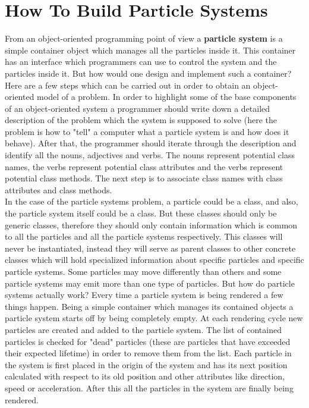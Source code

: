 \section{How To Build Particle Systems}
From an object-oriented programming point of view a \textbf{particle system} is a simple container object which manages all the particles inside it. This container has an interface which programmers can use to control the system and the particles inside it. But how would one design and implement such a container?\\

Here are a few steps which can be carried out in order to obtain an object-oriented model of a problem. In order to highlight some of the base components of an object-oriented system a programmer should write down a detailed description of the problem which the system is supposed to solve (here the problem is how to "tell" a computer what a particle system is and how does it behave). After that, the programmer should iterate through the description and identify all the nouns, adjectives and verbs. The nouns represent potential class names, the verbs represent potential class attributes and the verbs represent potential class methods. The next step is to associate class names with class attributes and class methods.\\

In the case of the particle systems problem, a particle could be a class, and also, the particle system itself could be a class. But these classes should only be generic classes, therefore they should only contain information which is common to all the particles and all the particle systems respectively. This classes will never be instantiated, instead they will serve as parent classes to other concrete classes which will hold specialized information about specific particles and specific particle systems. Some particles may move differently than others and some particle systems may emit more than one type of particles. But how do particle systems actually work? Every time a particle system is being rendered a few things happen. Being a simple container which manages its contained objects a particle system starts off by being completely empty. At each rendering cycle new particles are created and added to the particle system. The list of contained particles is checked for "dead" particles (these are particles that have exceeded their expected lifetime) in order to remove them from the list. Each particle in the system is first placed in the origin of the system and has its next position calculated with respect to its old position and other attributes like direction, speed or acceleration. After this all the particles in the system are finally being rendered.\\

